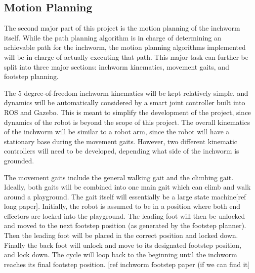 \subsection{Motion Planning}
The second major part of this project is the motion planning of the inchworm itself. While the path planning algorithm is in charge of determining an achievable path for the inchworm, the motion planning algorithms implemented will be in charge of actually executing that path. This major task can further be split into three major sections: inchworm kinematics, movement gaits, and footstep planning.

The 5 degree-of-freedom inchworm kinematics will be kept relatively simple, and dynamics will be automatically considered by a smart joint controller built into ROS and Gazebo. This is meant to simplify the development of the project, since dynamics of the robot is beyond the scope of this project. The overall kinematics of the inchworm will be similar to a robot arm, since the robot will have a stationary base during the movement gaits. However, two different kinematic controllers will need to be developed, depending what side of the inchworm is grounded.

The movement gaits include the general walking gait and the climbing gait. Ideally, both gaits will be combined into one main gait which can climb and walk around a playground. The gait itself will essentially be a large state machine[ref long paper]. Initially, the robot is assumed to be in a position where both end effectors are locked into the playground. The leading foot will then be unlocked and moved to the next footstep position (as generated by the footstep planner). Then the leading foot will be placed in the correct position and locked down. Finally the back foot will unlock and move to its designated footstep position, and lock down. The cycle will loop back to the beginning until the inchworm reaches its final footstep position. [ref inchworm footstep paper (if we can find it]
